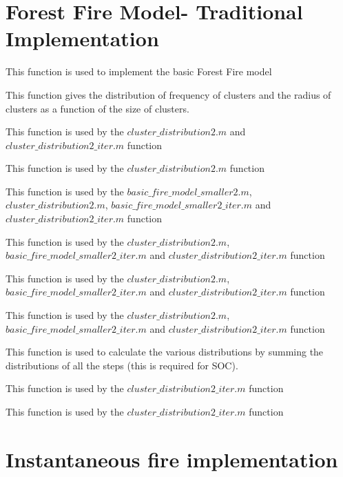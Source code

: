 \documentclass[11pt]{article}
\begin{document}


\begin{appendix}
\section{Forest Fire Model- Traditional Implementation}
This function is used to implement the basic Forest Fire model


This function gives the distribution of frequency of clusters and the radius of clusters as a function of the size of clusters.


This function is used by the $cluster\_distribution2.m$ and $cluster\_distribution2\_iter.m$ function


This function is used by the $cluster\_distribution2.m$ function


This function is used by the $basic\_fire\_model\_smaller2.m$, $cluster\_distribution2.m$, $basic\_fire\_model\_smaller2\_iter.m$ and $cluster\_distribution2\_iter.m$ function


This function is used by the $cluster\_distribution2.m$, $basic\_fire\_model\_smaller2\_iter.m$ and $cluster\_distribution2\_iter.m$ function


This function is used by the $cluster\_distribution2.m$, $basic\_fire\_model\_smaller2\_iter.m$ and $cluster\_distribution2\_iter.m$ function


This function is used by the $cluster\_distribution2.m$, $basic\_fire\_model\_smaller2\_iter.m$ and $cluster\_distribution2\_iter.m$ function


This function is used to calculate the various distributions by summing the distributions of all the steps (this is required for SOC).


This function is used by the $cluster\_distribution2\_iter.m$ function


This function is used by the $cluster\_distribution2\_iter.m$ function





\section{Instantaneous fire implementation}








\end{appendix}
\end{document}
